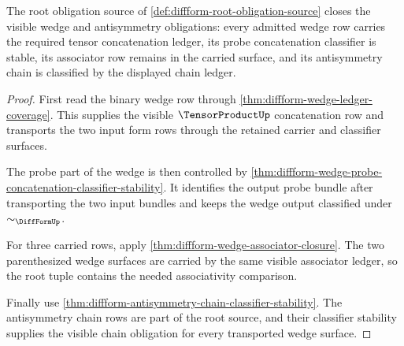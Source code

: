 \begin{theorem}
\label{thm:diffform-root-wedge-antisymmetry-obligation}
The root obligation source of
\autoref{def:diffform-root-obligation-source} closes the visible wedge and
antisymmetry obligations: every admitted wedge row carries the required
tensor concatenation ledger, its probe concatenation classifier is stable,
its associator row remains in the carried surface, and its antisymmetry chain
is classified by the displayed chain ledger.
\end{theorem}
\begin{proof}
First read the binary wedge row through
\autoref{thm:diffform-wedge-ledger-coverage}. This supplies the visible
$\TensorProductUp$ concatenation row and transports the two input form rows
through the retained carrier and classifier surfaces.

The probe part of the wedge is then controlled by
\autoref{thm:diffform-wedge-probe-concatenation-classifier-stability}. It
identifies the output probe bundle after transporting the two input bundles
and keeps the wedge output classified under $\sim_{\DiffFormUp}$.

For three carried rows, apply
\autoref{thm:diffform-wedge-associator-closure}. The two parenthesized wedge
surfaces are carried by the same visible associator ledger, so the root tuple
contains the needed associativity comparison.

Finally use
\autoref{thm:diffform-antisymmetry-chain-classifier-stability}. The
antisymmetry chain rows are part of the root source, and their classifier
stability supplies the visible chain obligation for every transported wedge
surface.
\end{proof}

